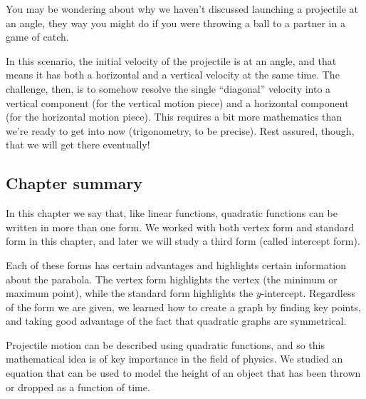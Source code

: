 You may be wondering about why we haven't discussed launching a projectile at an angle, they way you might do if you were throwing a ball to a partner in a game of catch.

In this scenario, the initial velocity of the projectile is at an angle, and that means it has both a horizontal and a vertical velocity at the same time. The challenge, then, is to somehow resolve the single ``diagonal'' velocity into a vertical component (for the vertical motion piece) and a horizontal component (for the horizontal motion piece). This requires a bit more mathematics than we're ready to get into now (trigonometry, to be precise). Rest assured, though, that we will get there eventually!


\subsection*{Chapter summary}

In this chapter we say that, like linear functions, quadratic functions can be written in more than one form. We worked with both vertex form and standard form in this chapter, and later we will study a third form (called intercept form).

Each of these forms has certain advantages and highlights certain information about the parabola. The vertex form highlights the vertex (the minimum or maximum point), while the standard form highlights the $y$-intercept. Regardless of the form we are given, we learned how to create a graph by finding key points, and taking good advantage of the fact that quadratic graphs are symmetrical.

Projectile motion can be described using quadratic functions, and so this mathematical idea is of key importance in the field of physics. We studied an equation that can be used to model the height of an object that has been thrown or dropped as a function of time.